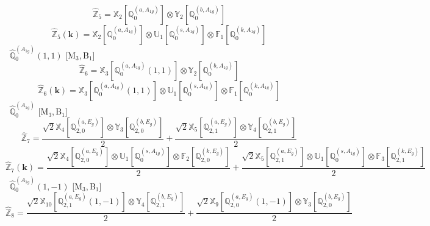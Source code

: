 \documentclass[fleqn,10pt,landscape]{article}
\begin{document}
\begin{itemize}
\begin{dmath*}
\hat{\mathbb{Z}}_{5}=\mathbb{X}_{2}[\mathbb{Q}_{0}^{(a,A_{1g})}] \otimes\mathbb{Y}_{2}[\mathbb{Q}_{0}^{(b,A_{1g})}]
\end{dmath*}
\begin{dmath*}
\hat{\mathbb{Z}}_{5}(\bm{k})=\mathbb{X}_{2}[\mathbb{Q}_{0}^{(a,A_{1g})}] \otimes\mathbb{U}_{1}[\mathbb{Q}_{0}^{(s,A_{1g})}] \otimes\mathbb{F}_{1}[\mathbb{Q}_{0}^{(k,A_{1g})}]
\end{dmath*}
\vspace{4mm}
\noindent {} $\,\,\,\hat{\mathbb{Q}}_{0}^{(A_{1g})}(1,1)$ [M$_{3}$,\,B$_{1}$]
\begin{dmath*}
\hat{\mathbb{Z}}_{6}=\mathbb{X}_{3}[\mathbb{Q}_{0}^{(a,A_{1g})}(1,1)] \otimes\mathbb{Y}_{2}[\mathbb{Q}_{0}^{(b,A_{1g})}]
\end{dmath*}
\begin{dmath*}
\hat{\mathbb{Z}}_{6}(\bm{k})=\mathbb{X}_{3}[\mathbb{Q}_{0}^{(a,A_{1g})}(1,1)] \otimes\mathbb{U}_{1}[\mathbb{Q}_{0}^{(s,A_{1g})}] \otimes\mathbb{F}_{1}[\mathbb{Q}_{0}^{(k,A_{1g})}]
\end{dmath*}
\vspace{4mm}
\noindent {} $\,\,\,\hat{\mathbb{Q}}_{0}^{(A_{1g})}$ [M$_{3}$,\,B$_{1}$]
\begin{dmath*}
\hat{\mathbb{Z}}_{7}=\frac{\sqrt{2} \mathbb{X}_{4}[\mathbb{Q}_{2,0}^{(a,E_{g})}] \otimes\mathbb{Y}_{3}[\mathbb{Q}_{2,0}^{(b,E_{g})}]}{2} + \frac{\sqrt{2} \mathbb{X}_{5}[\mathbb{Q}_{2,1}^{(a,E_{g})}] \otimes\mathbb{Y}_{4}[\mathbb{Q}_{2,1}^{(b,E_{g})}]}{2}
\end{dmath*}
\begin{dmath*}
\hat{\mathbb{Z}}_{7}(\bm{k})=\frac{\sqrt{2} \mathbb{X}_{4}[\mathbb{Q}_{2,0}^{(a,E_{g})}] \otimes\mathbb{U}_{1}[\mathbb{Q}_{0}^{(s,A_{1g})}] \otimes\mathbb{F}_{2}[\mathbb{Q}_{2,0}^{(k,E_{g})}]}{2} + \frac{\sqrt{2} \mathbb{X}_{5}[\mathbb{Q}_{2,1}^{(a,E_{g})}] \otimes\mathbb{U}_{1}[\mathbb{Q}_{0}^{(s,A_{1g})}] \otimes\mathbb{F}_{3}[\mathbb{Q}_{2,1}^{(k,E_{g})}]}{2}
\end{dmath*}
\vspace{4mm}
\noindent {} $\,\,\,\hat{\mathbb{Q}}_{0}^{(A_{1g})}(1,-1)$ [M$_{3}$,\,B$_{1}$]
\begin{dmath*}
\hat{\mathbb{Z}}_{8}=\frac{\sqrt{2} \mathbb{X}_{10}[\mathbb{Q}_{2,1}^{(a,E_{g})}(1,-1)] \otimes\mathbb{Y}_{4}[\mathbb{Q}_{2,1}^{(b,E_{g})}]}{2} + \frac{\sqrt{2} \mathbb{X}_{9}[\mathbb{Q}_{2,0}^{(a,E_{g})}(1,-1)] \otimes\mathbb{Y}_{3}[\mathbb{Q}_{2,0}^{(b,E_{g})}]}{2}
\end{dmath*}

\end{itemize}
\end{document}
